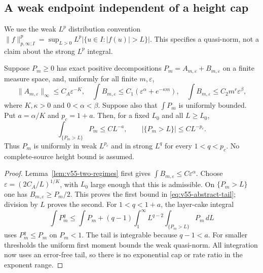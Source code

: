 \subsection{A weak endpoint independent of a height cap}
We use the weak $L^p$ distribution convention
$\|f\|_{p,\infty;I}^p=\sup_{L>0}L^p
 |\{u\in I:|f(u)|>L\}|$. This specifies a quasi-norm, not a
claim about the strong $L^p$ integral.

\begin{theorem}
\label{thm:v55-endpoint-principle}
Suppose $P_m\ge0$ has exact positive decompositions
$P_m=A_{m,\varepsilon}+B_{m,\varepsilon}$ on a finite measure
space, and, uniformly for all finite $m,\varepsilon$,
\[
 \|A_{m,\varepsilon}\|_\infty\le C_A\varepsilon^{-K},\quad
 \int B_{m,\varepsilon}\le C_1(\varepsilon^\alpha+e^{-\kappa m}),
 \quad \int B_{m,\varepsilon}\le C_2m^r\varepsilon^\beta,
\]
where $K,\kappa>0$ and $0<\alpha<\beta$. Suppose also that
$\int P_m$ is uniformly bounded. Put $a=\alpha/K$ and $p_c=1+a$.
Then, for a fixed $L_0$ and all $L\ge L_0$,
\begin{equation}\label{eq:v55-abstract-tail}
 \int_{\{P_m>L\}}P_m\le CL^{-a},\qquad
 |\{P_m>L\}|\le CL^{-p_c}.
\end{equation}
Thus $P_m$ is uniformly in weak $L^{p_c}$ and in strong $L^q$ for
every $1<q<p_c$. No complete-source height bound is assumed.
\end{theorem}
\begin{proof}
Lemma~\ref{lem:v55-two-regimes} first gives
$\int B_{m,\varepsilon}\le C\varepsilon^\alpha$. Choose
$\varepsilon=(2C_A/L)^{1/K}$, with $L_0$ large enough that this is
admissible. On $\{P_m>L\}$ one has
$B_{m,\varepsilon}\ge P_m/2$. This proves the first bound in
\eqref{eq:v55-abstract-tail}; division by $L$ proves the second.
For $1<q<1+a$, the layer-cake integral
\[
 \int P_m^q\le\int P_m+(q-1)\int_1^\infty
 L^{q-2}\int_{\{P_m>L\}}P_m\,dL
\]
uses $P_m^q\le P_m$ on $P_m<1$.
The tail is integrable because $q-1<a$. For smaller thresholds the
uniform first moment bounds the weak quasi-norm. All integration now
uses an error-free tail, so there is no exponential cap or rate ratio
in the exponent range.
\end{proof}

